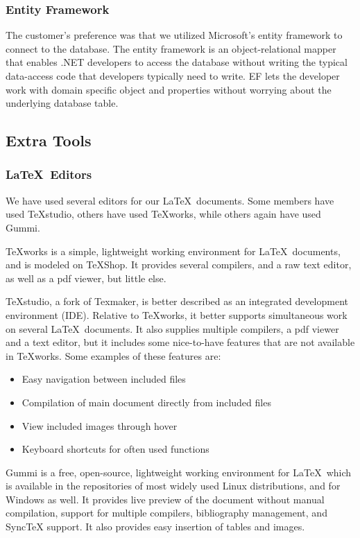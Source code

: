 \subsubsection{Entity Framework}
The customer's preference was that we utilized Microsoft's entity framework to connect to the database. The entity framework is an object-relational mapper that enables .NET developers to access the database without writing the typical data-access code that developers typically need to write. EF lets the developer work with domain specific object and properties without worrying about the underlying database table.

\subsection{Extra Tools}
\subsubsection{\LaTeX \ Editors}%
We have used several editors for our \LaTeX \ documents. Some members have used TeXstudio, others have used TeXworks, while others again have used Gummi.

TeXworks is a simple, lightweight working environment for \LaTeX \ documents, and is modeled on TeXShop. It provides several compilers, and a raw text editor, as well as a pdf viewer, but little else.

TeXstudio, a fork of Texmaker, is better described as an integrated development environment (IDE). Relative to TeXworks, it better supports simultaneous work on several \LaTeX \ documents. It also supplies multiple compilers, a pdf viewer and a text editor, but it includes some nice-to-have features that are not available in TeXworks. Some examples of these features are:
\begin{itemize}
\item Easy navigation between included files
\item Compilation of main document directly from included files
\item View included images through hover
\item Keyboard shortcuts for often used functions
\end{itemize}

Gummi is a free, open-source, lightweight working environment for \LaTeX \ which is available in the repositories of most widely used Linux distributions, and for Windows as well. It provides live preview of the document without manual compilation, support for multiple compilers, bibliography management, and SyncTeX support. It also provides easy insertion of tables and images.

